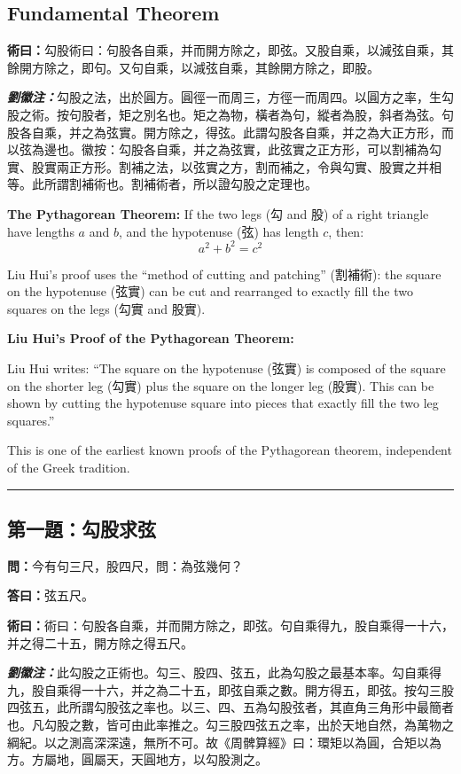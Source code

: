 \documentclass[11pt,a4paper]{article}
\newcommand{\wen}[1]{\textbf{\color{problemcolor}問：}#1\par}
\newcommand{\da}[1]{\textbf{答曰：}#1\par}
\newcommand{\shu}[1]{\textbf{術曰：}#1\par}
\newcommand{\liuhui}[1]{{\color{commentarycolor}\textit{\textbf{劉徽注：}}#1\par}}
\newenvironment{commentaryenv}{%
  \par\medskip\noindent\begingroup
  \setlength{\parskip}{0.5em}%
  \ignorespaces
}{%
  \par\endgroup\medskip
}
\begin{document}
\subsection*{Fundamental Theorem}

\shu{勾股術曰：句股各自乘，并而開方除之，即弦。又股自乘，以減弦自乘，其餘開方除之，即句。又句自乘，以減弦自乘，其餘開方除之，即股。}

\liuhui{勾股之法，出於圓方。圓徑一而周三，方徑一而周四。以圓方之率，生勾股之術。按句股者，矩之別名也。矩之為物，橫者為句，縱者為股，斜者為弦。句股各自乘，并之為弦實。開方除之，得弦。此謂勾股各自乘，并之為大正方形，而以弦為邊也。徽按：勾股各自乘，并之為弦實，此弦實之正方形，可以割補為勾實、股實兩正方形。割補之法，以弦實之方，割而補之，令與勾實、股實之并相等。此所謂割補術也。割補術者，所以證勾股之定理也。}

\textbf{The Pythagorean Theorem:} If the two legs (勾 and 股) of a right triangle have lengths $a$ and $b$, and the hypotenuse (弦) has length $c$, then:
\[
a^2 + b^2 = c^2
\]

Liu Hui's proof uses the ``method of cutting and patching'' (割補術): the square on the hypotenuse (弦實) can be cut and rearranged to exactly fill the two squares on the legs (勾實 and 股實).

\begin{commentaryenv}
\textbf{Liu Hui's Proof of the Pythagorean Theorem:}

Liu Hui writes: ``The square on the hypotenuse (弦實) is composed of the square on the shorter leg (勾實) plus the square on the longer leg (股實). This can be shown by cutting the hypotenuse square into pieces that exactly fill the two leg squares.''

This is one of the earliest known proofs of the Pythagorean theorem, independent of the Greek tradition.
\end{commentaryenv}

\bigskip
\hrule
\bigskip

\subsection{第一題：勾股求弦}

\wen{今有句三尺，股四尺，問：為弦幾何？}

\da{弦五尺。}

\shu{術曰：句股各自乘，并而開方除之，即弦。句自乘得九，股自乘得一十六，并之得二十五，開方除之得五尺。}

\liuhui{此勾股之正術也。勾三、股四、弦五，此為勾股之最基本率。勾自乘得九，股自乘得一十六，并之為二十五，即弦自乘之數。開方得五，即弦。按勾三股四弦五，此所謂勾股弦之率也。以三、四、五為勾股弦者，其直角三角形中最簡者也。凡勾股之數，皆可由此率推之。勾三股四弦五之率，出於天地自然，為萬物之綱紀。以之測高深深遠，無所不可。故《周髀算經》曰：環矩以為圓，合矩以為方。方屬地，圓屬天，天圓地方，以勾股測之。}
\end{document}
